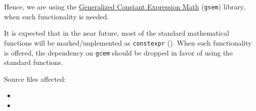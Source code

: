 Hence, we are using the \href{https://www.kthohr.com/gcem.html}{Generalized Constant Expression Math} 
(\texttt{gsem}) library, when such functionality is needed.

It is expected that in the near future, most of the standard mathematical functions 
will be marked/implemented as \texttt{constexpr} (\cite{rostencpp}). When such functionality is 
offered, the dependency on \texttt{gcem} should be dropped in favor of using the standard 
functions.

Source files affected:
\begin{itemize}
    \item {}
    \item {}
\end{itemize}

